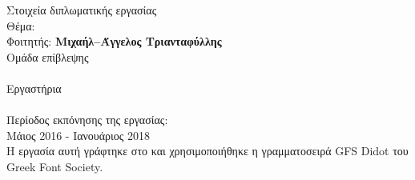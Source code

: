 \pagestyle{empty}
\begin{center}
\Large{Στοιχεία διπλωματικής εργασίας}\\[1cm]
{\large Θέμα:}
\textbf{\large \doctitle}\\[1cm]
\large {Φοιτητής: \textbf{Μιχαήλ--Άγγελος Τριανταφύλλης}\\[1cm]
\large{Ομάδα επίβλεψης}\\
\textbf{\suptitle \, \supname}\\[1cm]
Εργαστήρια\\
\lab \\[1cm]
Περίοδος εκπόνησης της εργασίας:\\ Μάιος 2016 - Ιανουάριος 2018\\[1cm]
Η εργασία αυτή γράφτηκε στο \XeLaTeX{} και χρησιμοποιήθηκε η γραμματοσειρά GFS Didot του Greek Font Society.}
\end{center}